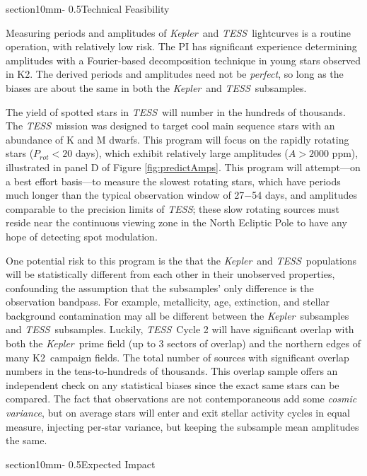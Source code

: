\documentclass[letterpaper,11pt]{article}
\makeatletter
\renewcommand{\section}{\@startsection%
{section}{1}{0mm}{-\baselineskip}%
{0.5\baselineskip}{\normalfont\Large\bfseries}}%
\newcommand{\tess}{{\it TESS}}
\newcommand{\kepler}{{\it Kepler}}
\newcommand{\ktwo}{{K2}}
\makeatother
\begin{document}
\section{Technical Feasibility}

Measuring periods and amplitudes of \kepler\ and \tess\ lightcurves is a routine operation, with relatively low risk.  The PI has significant experience determining amplitudes with a Fourier-based decomposition technique in young stars observed in \ktwo.  The derived periods and amplitudes need not be \emph{perfect}, so long as the biases are about the same in both the \kepler\ and \tess\ subsamples.

The yield of spotted stars in \tess\ will number in the hundreds of thousands.  The \tess\ mission was designed to target cool main sequence stars with an abundance of K and M dwarfs.  This program will focus on the rapidly rotating stars ($P_{rot}<20$ days), which exhibit relatively large amplitudes ($A>2000$ ppm), illustrated in panel D of Figure \ref{fig:predictAmps}.  This program will attempt---on a best effort basis---to measure the slowest rotating stars, which have periods much longer than the typical observation window of 27$-$54 days, and amplitudes comparable to the precision limits of \tess; these slow rotating sources must reside near the continuous viewing zone in the North Ecliptic Pole to have any hope of detecting spot modulation.

One potential risk to this program is the that the \kepler\ and \tess\ populations will be statistically different from each other in their unobserved properties, confounding the assumption that the subsamples' only difference is the observation bandpass.  For example, metallicity, age, extinction, and stellar background contamination may all be different between the \kepler\ subsamples and \tess\ subsamples.  Luckily, \tess\ Cycle 2 will have significant overlap with both the \kepler\ prime field (up to 3 sectors of overlap) and the northern edges of many \ktwo\ campaign fields.  The total number of sources with significant overlap numbers in the tens-to-hundreds of thousands.  This overlap sample offers an independent check on any statistical biases since the exact same stars can be compared.  The fact that observations are not contemporaneous add some \emph{cosmic variance}, but on average stars will enter and exit stellar activity cycles in equal measure, injecting per-star variance, but keeping the subsample mean amplitudes the same.

\section{Expected Impact}
\end{document}
